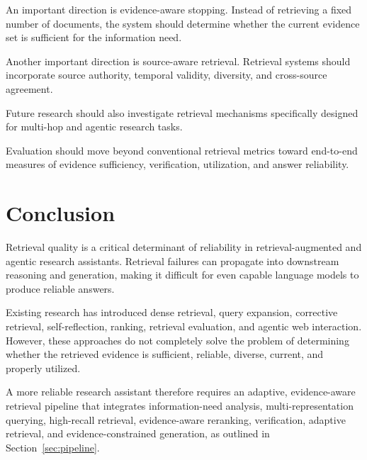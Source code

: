 \documentclass[12pt,a4paper]{article}
\begin{document}
An important direction is evidence-aware stopping. Instead of retrieving a
fixed number of documents, the system should determine whether the current
evidence set is sufficient for the information need.

Another important direction is source-aware retrieval. Retrieval systems
should incorporate source authority, temporal validity, diversity, and
cross-source agreement.

Future research should also investigate retrieval mechanisms specifically
designed for multi-hop and agentic research tasks.

Evaluation should move beyond conventional retrieval metrics toward
end-to-end measures of evidence sufficiency, verification, utilization,
and answer reliability.

\section{Conclusion}
\label{sec:conclusion}

Retrieval quality is a critical determinant of reliability in
retrieval-augmented and agentic research assistants. Retrieval failures can
propagate into downstream reasoning and generation, making it difficult for
even capable language models to produce reliable answers.

Existing research has introduced dense retrieval, query expansion,
corrective retrieval, self-reflection, ranking, retrieval evaluation, and
agentic web interaction. However, these approaches do not completely solve
the problem of determining whether the retrieved evidence is sufficient,
reliable, diverse, current, and properly utilized.

A more reliable research assistant therefore requires an adaptive,
evidence-aware retrieval pipeline that integrates information-need
analysis, multi-representation querying, high-recall retrieval,
evidence-aware reranking, verification, adaptive retrieval, and
evidence-constrained generation, as outlined in
Section~\ref{sec:pipeline}.


\printbibliography
\end{document}
